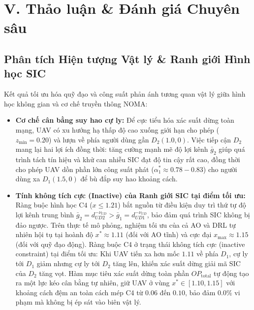 \section*{V. Thảo luận \& Đánh giá Chuyên sâu}

\subsection*{Phân tích Hiện tượng Vật lý \& Ranh giới Hình học SIC}
Kết quả tối ưu hóa quỹ đạo và công suất phản ánh tương quan vật lý giữa hình học không gian và cơ chế truyền thông NOMA:
\begin{itemize}[leftmargin=1.5em]
    \item \textbf{Cơ chế cân bằng suy hao cự ly:} Để cực tiểu hóa xác suất dừng toàn mạng, UAV có xu hướng hạ thấp độ cao xuống giới hạn cho phép ($z_{\min} = 0.20$) và lượn về phía người dùng gần $D_2(1.0, 0)$. Việc tiếp cận $D_2$ mang lại hai lợi ích đồng thời: tăng cường mạnh mẽ độ lợi kênh $\bar{g}_2$ giúp quá trình tách tín hiệu và khử can nhiễu SIC đạt độ tin cậy rất cao, đồng thời cho phép UAV dồn phần lớn công suất phát ($\alpha_1^* \approx 0.78 - 0.83$) cho người dùng xa $D_1(1.5, 0)$ để bù đắp suy hao khoảng cách.
    \item \textbf{Tính không tích cực (Inactive) của Ranh giới SIC tại điểm tối ưu:} Ràng buộc hình học $\text{C4}$ ($x \le 1.21$) bắt nguồn từ điều kiện duy trì thứ tự độ lợi kênh trung bình $\bar{g}_2 = d_{UD2}^{-\nu_{UD}} > \bar{g}_1 = d_{UD1}^{-\nu_{UD}}$, bảo đảm quá trình SIC không bị đảo ngược. Trên thực tế mô phỏng, nghiệm tối ưu của cả AO và DRL tự nhiên hội tụ tại hoành độ $x^* \approx 1.11$ (đối với AO tĩnh) và cực đại $x_{\max} \approx 1.15$ (đối với quỹ đạo động). Ràng buộc C4 ở trạng thái không tích cực (inactive constraint) tại điểm tối ưu: Khi UAV tiến xa hơn mốc $1.11$ về phía $D_1$, cự ly tới $D_1$ giảm nhưng cự ly tới $D_2$ tăng lên, khiến xác suất dừng giải mã SIC của $D_2$ tăng vọt. Hàm mục tiêu xác suất dừng toàn phần $OP_{\text{total}}$ tự động tạo ra một lực kéo cân bằng tự nhiên, giữ UAV ở vùng $x^* \in [1.10, 1.15]$ với khoảng cách đệm an toàn cách mép C4 từ $0.06$ đến $0.10$, bảo đảm $0.0\%$ vi phạm mà không bị ép sát vào biên vật lý.
\end{itemize}

